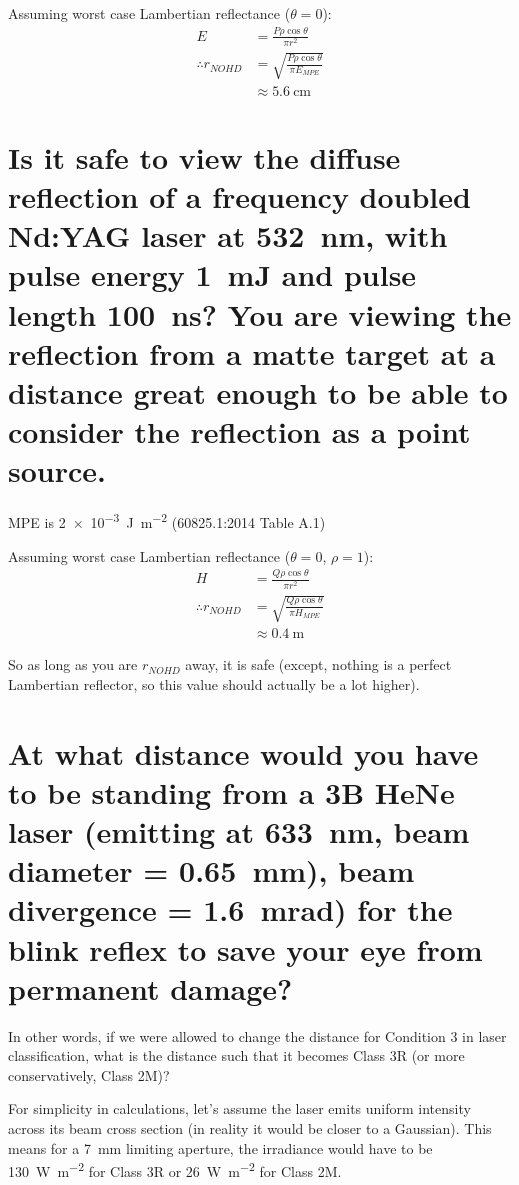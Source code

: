 \documentclass[a4paper]{scrartcl}
\begin{document}
Assuming worst case Lambertian reflectance (\(\theta = 0\)):
\begin{align*}
    E &= \frac{P \rho \cos \theta}{\pi r^2} \\
    \therefore r_{NOHD} &= \sqrt{\frac{P \rho \cos \theta}{\pi E_{MPE}}} \\
    &\approx \SI{5.6}{\centi\metre}
\end{align*}

\section{Is it safe to view the diffuse reflection of a frequency doubled Nd:YAG laser at \SI{532}{\nano\metre}, with pulse energy \SI{1}{\milli\joule} and pulse length \SI{100}{\nano\second}? You are viewing the reflection from a matte target at a distance great enough to be able to consider the reflection as a point source.}
MPE is \SI{2e-3}{\joule\per\metre\squared} (60825.1:2014 Table A.1)

Assuming worst case Lambertian reflectance (\(\theta = 0\), \(\rho = 1\)):
\begin{align*}
    H &= \frac{Q \rho \cos \theta}{\pi r^2} \\
    \therefore r_{NOHD} &= \sqrt{\frac{Q \rho \cos \theta}{\pi H_{MPE}}} \\
    &\approx \SI{0.4}{\metre}
\end{align*}

So as long as you are \(r_{NOHD}\) away, it is safe (except, nothing is a perfect Lambertian reflector, so this value should actually be a lot higher).

\section{At what distance would you have to be standing from a 3B HeNe laser (emitting at \SI{633}{\nano\metre}, beam diameter = \SI{0.65}{\milli\metre}), beam divergence = \SI{1.6}{\milli\radian}) for the blink reflex to save your eye from permanent damage?}
In other words, if we were allowed to change the distance for Condition 3 in laser classification, what is the distance such that it becomes Class 3R (or more conservatively, Class 2M)?

For simplicity in calculations, let's assume the laser emits uniform intensity across its beam cross section (in reality it would be closer to a Gaussian). This means for a \SI{7}{\milli\metre} limiting aperture, the irradiance would have to be \SI{130}{\watt\per\metre\squared} for Class 3R or \SI{26}{\watt\per\metre\squared} for Class 2M. 
\end{document}
